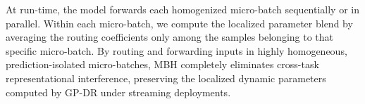 At run-time, the model forwards each homogenized micro-batch sequentially or in parallel. Within each micro-batch, we compute the localized parameter blend by averaging the routing coefficients only among the samples belonging to that specific micro-batch. By routing and forwarding inputs in highly homogeneous, prediction-isolated micro-batches, MBH completely eliminates cross-task representational interference, preserving the localized dynamic parameters computed by GP-DR under streaming deployments.